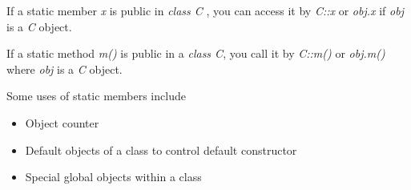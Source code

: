 \documentclass[
]{article}
\providecommand{\tightlist}{%
  \setlength{\itemsep}{0pt}\setlength{\parskip}{0pt}}
\begin{document}
If a static member \emph{x} is public in \emph{class C} , you can access
it by \emph{C::x} or \emph{obj.x} if \emph{obj} is a \emph{C} object.

If a static method \emph{m()} is public in a \emph{class C}, you call it
by \emph{C::m()} or \emph{obj.m()} where \emph{obj} is a \emph{C}
object.

Some uses of static members include

\begin{itemize}
\tightlist
\item
  Object counter
\item
  Default objects of a class to control default constructor
\item
  Special global objects within a class
\end{itemize}
\end{document}
